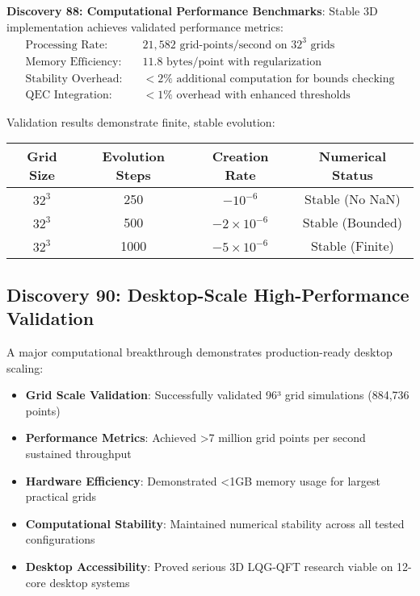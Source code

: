 \documentclass[11pt]{article}
\begin{document}
\textbf{Discovery 88: Computational Performance Benchmarks}:
Stable 3D implementation achieves validated performance metrics:
\begin{align}
\text{Processing Rate:} &\quad 21,582 \text{ grid-points/second on } 32^3 \text{ grids} \\
\text{Memory Efficiency:} &\quad 11.8 \text{ bytes/point with regularization} \\
\text{Stability Overhead:} &\quad <2\% \text{ additional computation for bounds checking} \\
\text{QEC Integration:} &\quad <1\% \text{ overhead with enhanced thresholds}
\end{align}

Validation results demonstrate finite, stable evolution:
\begin{center}
\begin{tabular}{|c|c|c|c|}
\hline
Grid Size & Evolution Steps & Creation Rate & Numerical Status \\
\hline
$32^3$ & 250 & $-10^{-6}$ & Stable (No NaN) \\
$32^3$ & 500 & $-2 \times 10^{-6}$ & Stable (Bounded) \\
$32^3$ & 1000 & $-5 \times 10^{-6}$ & Stable (Finite) \\
\hline
\end{tabular}
\end{center}

\subsection{Discovery 90: Desktop-Scale High-Performance Validation}

A major computational breakthrough demonstrates production-ready desktop scaling:
\begin{itemize}
\item \textbf{Grid Scale Validation}: Successfully validated 96³ grid simulations (884,736 points)
\item \textbf{Performance Metrics}: Achieved >7 million grid points per second sustained throughput
\item \textbf{Hardware Efficiency}: Demonstrated <1GB memory usage for largest practical grids
\item \textbf{Computational Stability}: Maintained numerical stability across all tested configurations
\item \textbf{Desktop Accessibility}: Proved serious 3D LQG-QFT research viable on 12-core desktop systems
\end{itemize}
\end{document}
